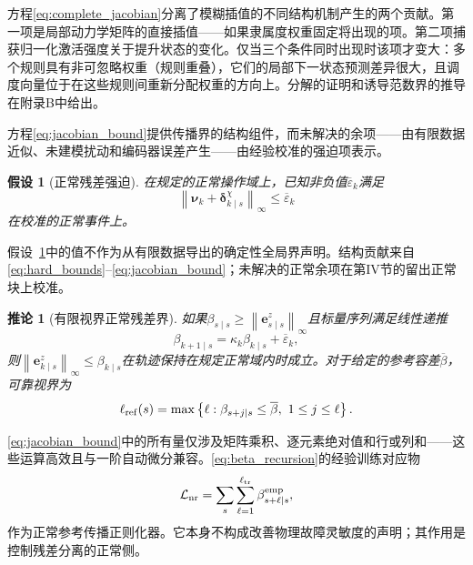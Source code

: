 \documentclass[journal]{IEEEtran}
\newtheorem{assumption}{假设}
\newtheorem{corollary}{推论}
\newcommand{\norm}[1]{\left\lVert #1\right\rVert}
\newcommand{\1}{\bm 1}
\begin{document}
方程\eqref{eq:complete_jacobian}分离了模糊插值的不同结构机制产生的两个贡献。第一项是局部动力学矩阵的直接插值——如果隶属度权重固定将出现的项。第二项捕获归一化激活强度关于提升状态的变化。仅当三个条件同时出现时该项才变大：多个规则具有非可忽略权重（规则重叠），它们的局部下一状态预测差异很大，且调度向量位于在这些规则间重新分配权重的方向上。分解的证明和诱导范数界的推导在附录B中给出。

方程\eqref{eq:jacobian_bound}提供传播界的结构组件，而未解决的余项——由有限数据近似、未建模扰动和编码器误差产生——由经验校准的强迫项表示。

\begin{assumption}[正常残差强迫]
\label{ass:normal}
在规定的正常操作域上，已知非负值$\overline{\varepsilon}_k$满足
\begin{equation}
\norm{\bm\nu_k+\bm\delta_{k\mid s}^{\chi}}_\infty
\leq\overline{\varepsilon}_k
\label{eq:forcing_bound}
\end{equation}
在校准的正常事件上。
\end{assumption}

假设~\ref{ass:normal}中的值不作为从有限数据导出的确定性全局界声明。结构贡献来自\eqref{eq:hard_bounds}--\eqref{eq:jacobian_bound}；未解决的正常余项在第IV节的留出正常块上校准。

\begin{corollary}[有限视界正常残差界]
\label{cor:bound}
如果$\beta_{s\mid s}\geq\norm{\bm e_{s\mid s}^z}_\infty$且标量序列满足线性递推
\begin{equation}
\beta_{k+1\mid s}=\kappa_k\beta_{k\mid s}
+\overline{\varepsilon}_k,
\label{eq:beta_recursion}
\end{equation}
则$\norm{\bm e_{k\mid s}^z}_\infty\leq\beta_{k\mid s}$在轨迹保持在规定正常域内时成立。对于给定的参考容差$\overline{\beta}$，可靠视界为
\begin{equation}
\ell_{\rm ref}(s)=
\max\left\{\ell:\beta_{s+j\mid s}\leq\overline{\beta},
\ 1\leq j\leq\ell\right\}.
\label{eq:reliable_horizon}
\end{equation}
\end{corollary}

\eqref{eq:jacobian_bound}中的所有量仅涉及矩阵乘积、逐元素绝对值和行或列和——这些运算高效且与一阶自动微分兼容。\eqref{eq:beta_recursion}的经验训练对应物
\begin{equation}
\mathcal L_{\rm nr}=
\sum_s\sum_{\ell=1}^{\ell_{\rm tr}}
\beta_{s+\ell\mid s}^{\rm emp},
\label{eq:normal_propagation_loss}
\end{equation}
作为正常参考传播正则化器。它本身不构成改善物理故障灵敏度的声明；其作用是控制残差分离的正常侧。
\end{document}

